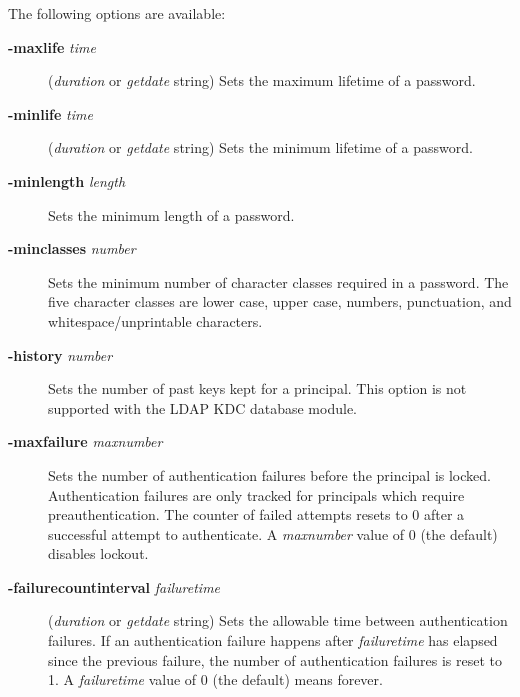 \documentclass[letterpaper,10pt,english]{sphinxmanual}
\begin{document}
The following options are available:
\begin{description}
\item[{\textbf{-maxlife} \emph{time}}] \leavevmode
(\emph{duration} or \emph{getdate} string) Sets the maximum
lifetime of a password.

\item[{\textbf{-minlife} \emph{time}}] \leavevmode
(\emph{duration} or \emph{getdate} string) Sets the minimum
lifetime of a password.

\item[{\textbf{-minlength} \emph{length}}] \leavevmode
Sets the minimum length of a password.

\item[{\textbf{-minclasses} \emph{number}}] \leavevmode
Sets the minimum number of character classes required in a
password.  The five character classes are lower case, upper case,
numbers, punctuation, and whitespace/unprintable characters.

\item[{\textbf{-history} \emph{number}}] \leavevmode
Sets the number of past keys kept for a principal.  This option is
not supported with the LDAP KDC database module.

\end{description}
\label{admin/admin_commands/kadmin_local:policy-maxfailure}\begin{description}
\item[{\textbf{-maxfailure} \emph{maxnumber}}] \leavevmode
Sets the number of authentication failures before the principal is
locked.  Authentication failures are only tracked for principals
which require preauthentication.  The counter of failed attempts
resets to 0 after a successful attempt to authenticate.  A
\emph{maxnumber} value of 0 (the default) disables lockout.

\end{description}
\label{admin/admin_commands/kadmin_local:policy-failurecountinterval}\begin{description}
\item[{\textbf{-failurecountinterval} \emph{failuretime}}] \leavevmode
(\emph{duration} or \emph{getdate} string) Sets the allowable time
between authentication failures.  If an authentication failure
happens after \emph{failuretime} has elapsed since the previous
failure, the number of authentication failures is reset to 1.  A
\emph{failuretime} value of 0 (the default) means forever.

\end{description}
\end{document}
